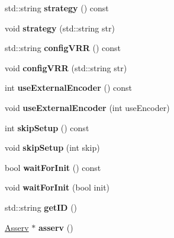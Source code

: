 \begin{DoxyCompactItemize}
\mbox{\label{classRobot_a54154ee94652d3093fba07052cdbc861}} 
std\+::string {\bfseries strategy} () const
\item 
\mbox{\label{classRobot_ae9ee7be96f7ded681dac82e7b398af0a}} 
void {\bfseries strategy} (std\+::string str)
\item 
\mbox{\label{classRobot_a364306ad33197e80bc96b5e73ef2e695}} 
std\+::string {\bfseries config\+V\+RR} () const
\item 
\mbox{\label{classRobot_a0d75b0f6088735618e36dbbee5714464}} 
void {\bfseries config\+V\+RR} (std\+::string str)
\item 
\mbox{\label{classRobot_a66aec74d4150cce49d5c7e64f89d0bf3}} 
int {\bfseries use\+External\+Encoder} () const
\item 
\mbox{\label{classRobot_ae0d2edb6bf1f6123fa7964fad1d5b8e5}} 
void {\bfseries use\+External\+Encoder} (int use\+Encoder)
\item 
\mbox{\label{classRobot_a0bde038f1ccdfd979f17bfd9ddf25ba3}} 
int {\bfseries skip\+Setup} () const
\item 
\mbox{\label{classRobot_a4f8cbcd01bdb437b55566e3b90fbb9b3}} 
void {\bfseries skip\+Setup} (int skip)
\item 
\mbox{\label{classRobot_a37f7fd3014bcc768c0aed0a3c66fb67f}} 
bool {\bfseries wait\+For\+Init} () const
\item 
\mbox{\label{classRobot_a7c403d0ec7a04f13affd6c203e47e3a3}} 
void {\bfseries wait\+For\+Init} (bool init)
\item 
\mbox{\label{classRobot_a36b66143430e84b730555cf497b89774}} 
std\+::string {\bfseries get\+ID} ()
\item 
\mbox{\label{classRobot_a7d4f643560467cf70ed765e5f4b5ddb7}} 
\hyperlink{classAsserv}{Asserv} $\ast$ {\bfseries asserv} ()
\item 
\mbox{\label{classRobot_a4f30918c35c294fbd5404fc3c3ffc075}} 

\end{DoxyCompactItemize}
